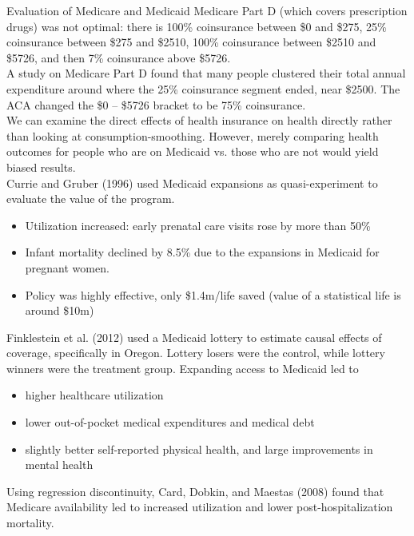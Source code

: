 \documentclass[8pt]{extarticle}
\begin{document}
  \begin{problem}{Evaluation of Medicare and Medicaid}
    Medicare Part D (which covers prescription drugs) was not optimal: there is 100\% coinsurance between \$0 and \$275, 25\% coinsurance between \$275 and \$2510, 100\% coinsurance between \$2510 and \$5726, and then 7\% coinsurance above \$5726.\\

    A study on Medicare Part D found that many people clustered their total annual expenditure around where the 25\% coinsurance segment ended, near \$2500. The ACA changed the \$0 -- \$5726 bracket to be 75\% coinsurance.\\

    We can examine the direct effects of health insurance on health directly rather than looking at consumption-smoothing. However, merely comparing health outcomes for people who are on Medicaid vs. those who are not would yield biased results.\\

    Currie and Gruber (1996) used Medicaid expansions as quasi-experiment to evaluate the value of the program.
    \begin{itemize}
      \item Utilization increased: early prenatal care visits rose by more than 50\%
      \item Infant mortality declined by 8.5\% due to the expansions in Medicaid for pregnant women.
      \item Policy was highly effective, only \$1.4m/life saved (value of a statistical life is around \$10m)
    \end{itemize}
    Finklestein et al. (2012) used a Medicaid lottery to estimate causal effects of coverage, specifically in Oregon. Lottery losers were the control, while lottery winners were the treatment group. Expanding access to Medicaid led to
    \begin{itemize}
      \item higher healthcare utilization
      \item lower out-of-pocket medical expenditures and medical debt
      \item slightly better self-reported physical health, and large improvements in mental health
    \end{itemize}
    Using regression discontinuity, Card, Dobkin, and Maestas (2008) found that Medicare availability led to increased utilization and lower post-hospitalization mortality.
  \end{problem}
\end{document}
